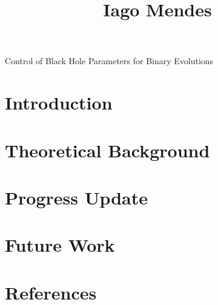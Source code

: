 \documentclass{../document}
\begin{document}
	\title
		[Caltech SURF's First Interim Report]
		{Iago Mendes}
		{Control of Black Hole Parameters for Binary Evolutions}

	\section{Introduction}
  
  \section{Theoretical Background}

	\section{Progress Update}

	\section{Future Work}

	\section*{References}

	\printbibliography[heading=none]
\end{document}
